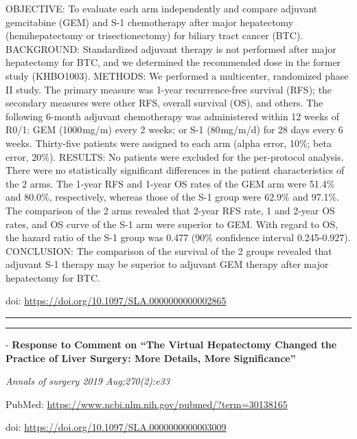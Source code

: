 \documentclass[]{article}
\begin{document}
OBJECTIVE: To evaluate each arm independently and compare adjuvant
gemcitabine (GEM) and S-1 chemotherapy after major hepatectomy
(hemihepatectomy or trisectionectomy) for biliary tract cancer (BTC).
BACKGROUND: Standardized adjuvant therapy is not performed after major
hepatectomy for BTC, and we determined the recommended dose in the
former study (KHBO1003). METHODS: We performed a multicenter, randomized
phase II study. The primary measure was 1-year recurrence-free survival
(RFS); the secondary measures were other RFS, overall survival (OS), and
others. The following 6-month adjuvant chemotherapy was administered
within 12 weeks of R0/1: GEM (1000 mg/m) every 2 weeks; or S-1
(80 mg/m/d) for 28 days every 6 weeks. Thirty-five patients were
assigned to each arm (alpha error, 10\%; beta error, 20\%). RESULTS: No
patients were excluded for the per-protocol analysis. There were no
statistically significant differences in the patient characteristics of
the 2 arms. The 1-year RFS and 1-year OS rates of the GEM arm were
51.4\% and 80.0\%, respectively, whereas those of the S-1 group were
62.9\% and 97.1\%. The comparison of the 2 arms revealed that 2-year RFS
rate, 1 and 2-year OS rates, and OS curve of the S-1 arm were superior
to GEM. With regard to OS, the hazard ratio of the S-1 group was 0.477
(90\% confidence interval 0.245-0.927). CONCLUSION: The comparison of
the survival of the 2 groups revealed that adjuvant S-1 therapy may be
superior to adjuvant GEM therapy after major hepatectomy for BTC.

doi: \url{https://doi.org/10.1097/SLA.0000000000002865}

{}

{}

\begin{center}\rule{0.5\linewidth}{\linethickness}\end{center}

\begin{center}\rule{0.5\linewidth}{\linethickness}\end{center}

 - \textbf{Response to Comment on ``The Virtual Hepatectomy Changed the
Practice of Liver Surgery: More Details, More Significance''}

\emph{Annals of surgery 2019 Aug;270(2):e33}

PubMed: \url{https://www.ncbi.nlm.nih.gov/pubmed/?term=30138165}

doi: \url{https://doi.org/10.1097/SLA.0000000000003009}

{}
\end{document}
